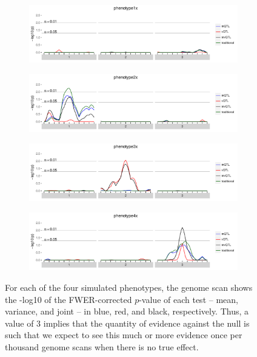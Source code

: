 \documentclass{article}
\begin{document}
\begin{figure}[ht!]
    \begin{subfigure}[b]{0.9\textwidth}
        \includegraphics[width=\textwidth]{images/empir_p_scan_phenotype1x.pdf}
    \end{subfigure}

    \begin{subfigure}[b]{0.9\textwidth}
        \includegraphics[width=\textwidth]{images/empir_p_scan_phenotype2x.pdf}
    \end{subfigure}

    \begin{subfigure}[b]{0.9\textwidth}
        \includegraphics[width=\textwidth]{images/empir_p_scan_phenotype3x.pdf}
    \end{subfigure}

    \begin{subfigure}[b]{0.9\textwidth}
        \includegraphics[width=\textwidth]{images/empir_p_scan_phenotype4x.pdf}
    \end{subfigure}

    \caption{For each of the four simulated phenotypes, the genome scan shows the -log10 of the FWER-corrected $p$-value of each test -- mean, variance, and joint -- in blue, red, and black, respectively. Thus, a value of 3 implies that the quantity of evidence against the null is such that we expect to see this much or more evidence once per thousand genome scans when there is no true effect. \label{fig:apdx_empir_p_scans}}
\end{figure}
\end{document}
